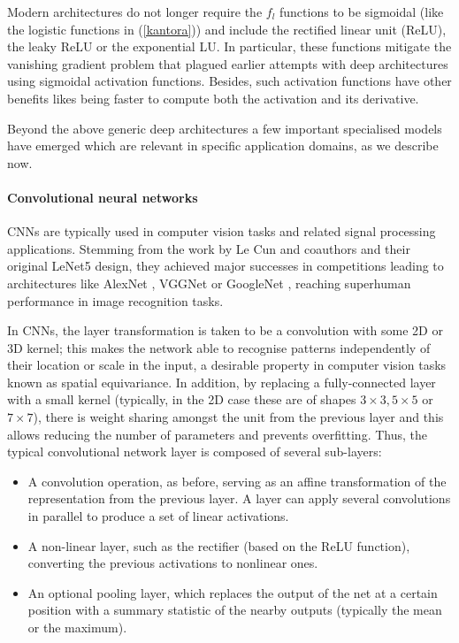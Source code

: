 Modern architectures do not longer require the
$f_l$ functions to be sigmoidal (like the  
logistic functions in (\ref{kantora})) and include  
the rectified linear unit (ReLU), the leaky ReLU
or the exponential LU. In particular, these functions mitigate the vanishing gradient problem \parencite{kolen2001gradient} that 
plagued earlier attempts with deep architectures using sigmoidal
activation functions. Besides, such activation functions have other benefits likes being faster to compute both the activation and its derivative.

Beyond the above generic deep architectures 
a few important specialised models have emerged which 
are relevant in specific application domains,
as we describe now. 
\paragraph{Convolutional neural networks} 
CNNs are typically used 
 in computer vision tasks and related signal processing applications.
 Stemming from the work by Le Cun and coauthors  
  \parencite{lecun89, lecun98} and their original 
  LeNet5 design, they achieved major
 successes  in  competitions \parencite{NIPS2012_c399862d}
 leading to architectures like 
 AlexNet       \parencite{NIPS2012_c399862d}, VGGNet \parencite{simonyan2014very} or
 GoogleNet \parencite{szegedy2015going}, reaching 
 superhuman performance in 
 image recognition tasks.
 
 In CNNs, the layer transformation is taken to be a convolution with some 2D or 3D kernel; this makes the network able to recognise patterns independently of their location or scale in the input, a desirable property in computer vision tasks known as spatial equivariance. In addition, by replacing a fully-connected layer with a small kernel (typically, in the 2D case these are of shapes $3\times3, 5\times 5$ or $7\times 7$), there is weight sharing amongst the unit from the previous layer and this allows reducing 
 the number of parameters and prevents overfitting.
 Thus, the typical convolutional network layer is composed of several sub-layers:
 \begin{itemize}
     \item A convolution operation, as before, 
     serving as an affine transformation of the representation from the previous layer. A layer can apply several convolutions in parallel to produce a set of linear activations.
     \item A non-linear layer, such as the rectifier (based on the ReLU function), converting the previous activations to nonlinear ones.
     \item An optional pooling layer, which replaces the output of the net at a certain position with a summary statistic of 
     the nearby outputs (typically the mean or the maximum).  
 \end{itemize}
 
